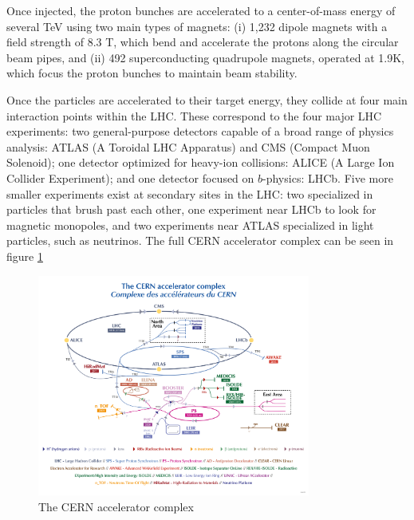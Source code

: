 Once injected, the proton bunches are accelerated to a center-of-mass energy of several TeV using two main types of magnets: (i) 1,232 dipole magnets with a field strength of 8.3 T, which bend and accelerate the protons along the circular beam pipes, and (ii) 492 superconducting quadrupole magnets, operated at 1.9\textdegree K, which focus the proton bunches to maintain beam stability.

Once the particles are accelerated to their target energy, they collide at four main interaction points within the LHC. These correspond to the four major LHC experiments: two general-purpose detectors capable of a broad range of physics analysis: ATLAS (A Toroidal LHC Apparatus) and CMS (Compact Muon Solenoid); one detector optimized for heavy-ion collisions: ALICE (A Large Ion Collider Experiment); and one detector focused on $b$-physics: LHCb. Five more smaller experiments exist at secondary sites in the LHC: two specialized in particles that brush past each other, one experiment near LHCb to look for magnetic monopoles, and two experiments near ATLAS specialized in light particles, such as neutrinos. The full CERN accelerator complex can be seen in figure \ref{fig:cern-accelerator-complex}

\begin{figure}[htbp]
    \centering
    \includegraphics[width=0.8\textwidth]{figures/chapter3/CERN-accelerator-complex.png}
    \caption{The CERN accelerator complex \cite{ref:Lopienska}}
    \label{fig:cern-accelerator-complex}
\end{figure}



